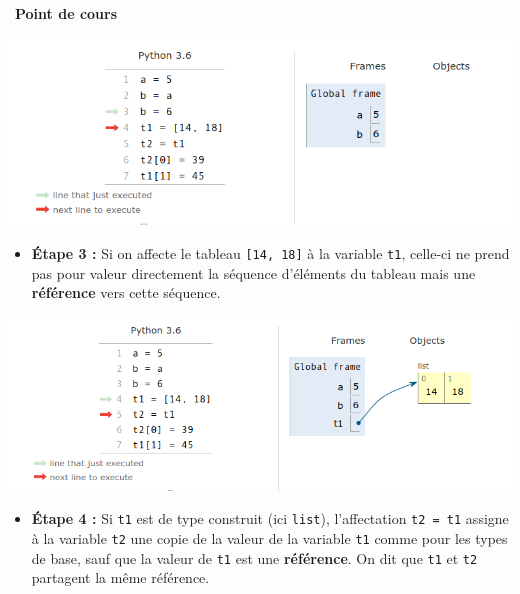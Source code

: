 \documentclass[
  11pt,
]{article}
\newcommand{\passthrough}[1]{#1}
\providecommand{\tightlist}{%
  \setlength{\itemsep}{0pt}\setlength{\parskip}{0pt}}
\newcounter{cours}
\newenvironment{cours}[1]
{\par \medskip   \addtocounter{cours}{1} \noindent  
\begin{bclogo}[arrondi =0.1,  ombre = true, barre=none, logo=\bcbook, marge=4]{~\textbf{Point de cours} \textbf{\thecours} {\itshape #1} }  \par}
{
\end{bclogo}
 \par \bigskip }
\begin{document}
\begin{cours}{}
\begin{itemize}
  \includegraphics{images/aliasing2.png}\\

  \begin{itemize}
  \tightlist
  \item
    \textbf{Étape 3 :} Si on affecte le tableau
    \passthrough{\lstinline![14, 18]!} à la variable
    \passthrough{\lstinline!t1!}, celle-ci ne prend pas pour valeur
    directement la séquence d'éléments du tableau mais une
    \textbf{référence} vers cette séquence.
  \end{itemize}

  \includegraphics{images/aliasing3.png}\\

  \begin{itemize}
  \item
    \textbf{Étape 4 :} Si \passthrough{\lstinline!t1!} est de type
    construit (ici \passthrough{\lstinline!list!}), l'affectation
    \passthrough{\lstinline!t2 = t1!} assigne à la variable
    \passthrough{\lstinline!t2!} une copie de la valeur de la variable
    \passthrough{\lstinline!t1!} comme pour les types de base, sauf que
    la valeur de \passthrough{\lstinline!t1!} est une
    \textbf{référence}. On dit que \passthrough{\lstinline!t1!} et
    \passthrough{\lstinline!t2!} partagent la même référence.


\end{itemize}
\end{itemize}
\end{cours}
\end{document}
